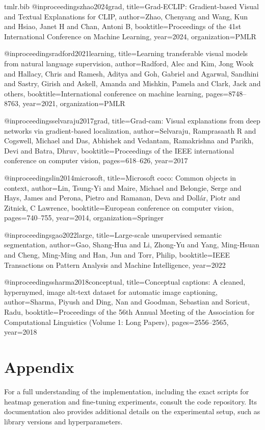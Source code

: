 \documentclass[10pt]{article} %
\begin{document}
\begin{filecontents}{tmlr.bib}
@inproceedings{zhao2024grad,
  title={Grad-ECLIP: Gradient-based Visual and Textual Explanations for CLIP},
  author={Zhao, Chenyang and Wang, Kun and Hsiao, Janet H and Chan, Antoni B},
  booktitle={Proceedings of the 41st International Conference on Machine Learning},
  year={2024},
  organization={PMLR}
}

@inproceedings{radford2021learning,
  title={Learning transferable visual models from natural language supervision},
  author={Radford, Alec and Kim, Jong Wook and Hallacy, Chris and Ramesh, Aditya and Goh, Gabriel and Agarwal, Sandhini and Sastry, Girish and Askell, Amanda and Mishkin, Pamela and Clark, Jack and others},
  booktitle={International conference on machine learning},
  pages={8748--8763},
  year={2021},
  organization={PMLR}
}

@inproceedings{selvaraju2017grad,
  title={Grad-cam: Visual explanations from deep networks via gradient-based localization},
  author={Selvaraju, Ramprasaath R and Cogswell, Michael and Das, Abhishek and Vedantam, Ramakrishna and Parikh, Devi and Batra, Dhruv},
  booktitle={Proceedings of the IEEE international conference on computer vision},
  pages={618--626},
  year={2017}
}

@inproceedings{lin2014microsoft,
  title={Microsoft coco: Common objects in context},
  author={Lin, Tsung-Yi and Maire, Michael and Belongie, Serge and Hays, James and Perona, Pietro and Ramanan, Deva and Doll{\'a}r, Piotr and Zitnick, C Lawrence},
  booktitle={European conference on computer vision},
  pages={740--755},
  year={2014},
  organization={Springer}
}

@inproceedings{gao2022large,
  title={Large-scale unsupervised semantic segmentation},
  author={Gao, Shang-Hua and Li, Zhong-Yu and Yang, Ming-Hsuan and Cheng, Ming-Ming and Han, Jun and Torr, Philip},
  booktitle={IEEE Transactions on Pattern Analysis and Machine Intelligence},
  year={2022}
}

@inproceedings{sharma2018conceptual,
  title={Conceptual captions: A cleaned, hypernymed, image alt-text dataset for automatic image captioning},
  author={Sharma, Piyush and Ding, Nan and Goodman, Sebastian and Soricut, Radu},
  booktitle={Proceedings of the 56th Annual Meeting of the Association for Computational Linguistics (Volume 1: Long Papers)},
  pages={2556--2565},
  year={2018}
}
\end{filecontents}

\appendix
\section{Appendix}
For a full understanding of the implementation, including the exact scripts for heatmap generation and fine-tuning experiments, consult the code repository. Its documentation also provides additional details on the experimental setup, such as library versions and hyperparameters.
\end{document}
